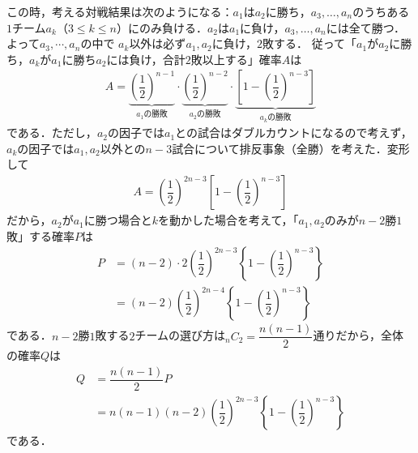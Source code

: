 \documentclass[../../main.tex]{subfiles}
\begin{document}
この時，考える対戦結果は次のようになる：$a_1$は$a_2$に勝ち，$a_3,\ldots,a_n$のうちある$1$チーム$a_k$（$3\le k\le n$）にのみ負ける．$a_2$は$a_1$に負け，$a_3,\ldots,a_n$には全て勝つ．よって$a_3,\cdots,a_n$の中で $a_k$以外は必ず$a_1,a_2$に負け，$2$敗する．
従って「$a_1$が$a_2$に勝ち，$a_k$が$a_1$に勝ち$a_2$には負け，合計$2$敗以上する」確率$A$は
\begin{align}
  A = \underbrace{\left(\dfrac{1}{2}\right)^{n-1}}_{a_1\text{の勝敗}}
  \cdot
  \underbrace{\left(\dfrac{1}{2}\right)^{n-2}}_{a_2\text{の勝敗}}
  \cdot
  \underbrace{\left[1-\left(\dfrac{1}{2}\right)^{n-3}\right]}_{a_k\text{の勝敗}}
\end{align}
である．ただし，$a_2$の因子では$a_1$との試合はダブルカウントになるので考えず，$a_k$の因子では$a_1,a_2$以外との$n-3$試合について排反事象（全勝）を考えた．変形して
\begin{align}
  A = \left(\dfrac{1}{2}\right)^{2n-3}\left[1-\left(\dfrac{1}{2}\right)^{n-3}\right]
\end{align}
だから，$a_2$が$a_1$に勝つ場合と$k$を動かした場合を考えて，「$a_1,a_2$のみが$n-2$勝$1$敗」する確率$P$は
\begin{align}
  P
  &=(n-2)\cdot2\left(\dfrac{1}{2}\right)^{2n-3}\left\{1-\left(\dfrac{1}{2}\right)^{n-3}\right\}\\
  &=(n-2)\left(\dfrac{1}{2}\right)^{2n-4}\left\{1-\left(\dfrac{1}{2}\right)^{n-3}\right\}
\end{align}
である．$n-2$勝$1$敗する$2$チームの選び方は${}_nC_2=\dfrac{n(n-1)}{2}$通りだから，全体の確率$Q$は
\begin{align}
  Q &= \dfrac{n(n-1)}{2} P\\
  &=  n(n-1)(n-2)\left(\dfrac{1}{2}\right)^{2n-3}\left\{1-\left(\dfrac{1}{2}\right)^{n-3}\right\}
\end{align}
である．

\newpage
\end{document}

